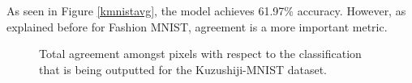 \documentclass[conference]{IEEEtran}
\begin{document}
As seen in Figure \ref{kmnistavg}, the model achieves 61.97\% accuracy. However, as explained before for Fashion MNIST, agreement is a more important metric.

\begin{figure}[htbp]
\caption{ Total agreement amongst pixels with respect to the classification that is being outputted for the Kuzushiji-MNIST dataset.}
\label{kmnistagree}
\end{figure}
\end{document}
